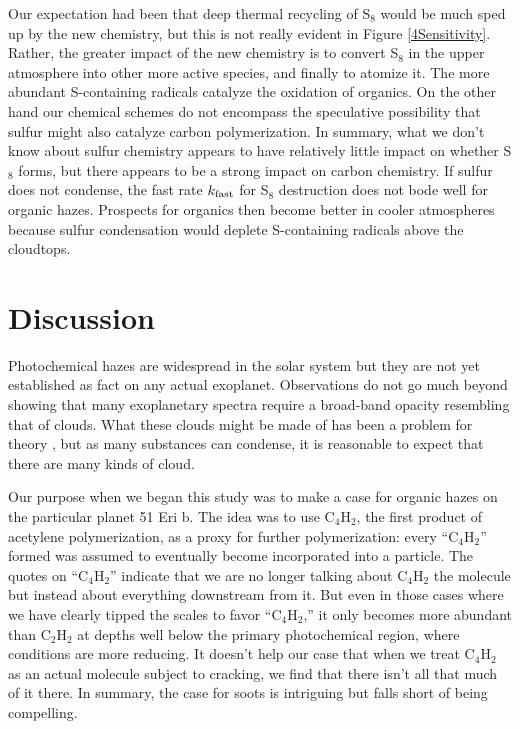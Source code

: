 \documentclass[preprint]{aastex6}
\begin{document}
Our expectation had been that deep thermal recycling of S$_8$ would be much sped up by the new chemistry, but this is
not really evident in Figure \ref{4Sensitivity}.  Rather, the greater impact of the new chemistry is
to convert S$_8$ in the upper atmosphere into other more active species, and finally to atomize it.
The more abundant S-containing radicals catalyze the oxidation of organics.
On the other hand our chemical schemes do not encompass the speculative possibility that sulfur
might also catalyze carbon polymerization. 
 In summary, what we don't know about sulfur chemistry appears to have relatively little impact on 
 whether S$_8$ forms, but there appears to be a strong impact on carbon chemistry. 
 If sulfur does not condense, the fast rate $k_{\rm fast}$ for S$_8$ destruction does not bode well for organic hazes.
 Prospects for organics then become better in cooler atmospheres
  because sulfur condensation would deplete S-containing radicals above the cloudtops.
 

\section{Discussion}

Photochemical hazes are widespread in the solar system 
but they are not yet established as fact on any actual exoplanet.
Observations do not go much beyond showing that many exoplanetary spectra require a broad-band opacity
resembling that of clouds.  
What these clouds might be made of has been a problem for theory \citep{Helling2014,Morley2015},
but as many substances can condense, it is reasonable to expect that there are many kinds of cloud.

Our purpose when we began this study was to make a case for organic hazes on the particular planet 51 Eri b.
The idea was to use C$_4$H$_2$, the first product of acetylene polymerization, as a
proxy for further polymerization: every ``C$_4$H$_2$'' formed was assumed to eventually become incorporated into a particle.
The quotes on ``C$_4$H$_2$'' indicate that we are no longer
talking about C$_4$H$_2$ the molecule but instead about everything downstream from it. 
But even in those cases where we have clearly tipped the scales to favor ``C$_4$H$_2$,''
 it only becomes more abundant than C$_2$H$_2$ at depths well below the primary photochemical region, 
 where conditions are more reducing.
It doesn't help our case that when we treat C$_4$H$_2$ as an actual molecule subject to cracking,
we find that there isn't all that much of it there.
In summary, the case for soots is intriguing but falls short of being compelling. %
\end{document}
